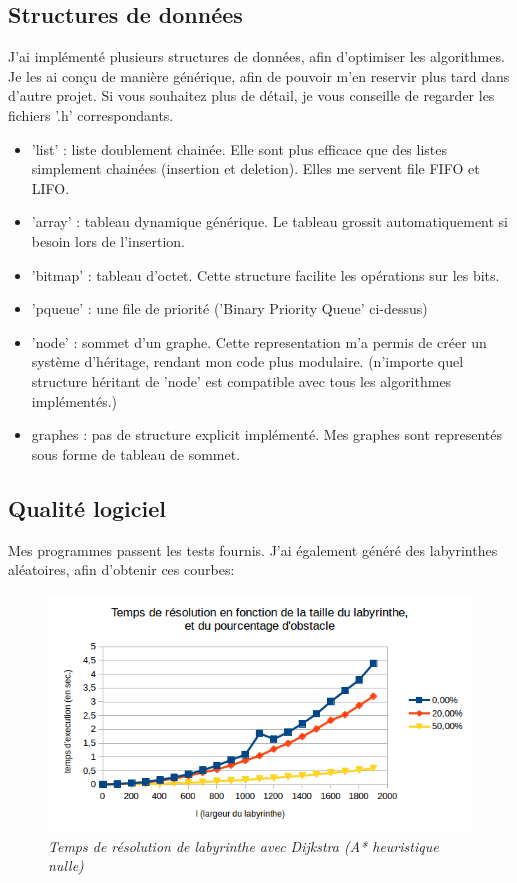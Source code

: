 \documentclass[a4paper,10pt]{article}
\begin{document}
    \subsection{Structures de données}
      J'ai implémenté plusieurs structures de données, afin d'optimiser les algorithmes. Je les ai conçu de manière générique,
      afin de pouvoir m'en reservir plus tard dans d'autre projet. Si vous souhaitez plus de détail, je vous
      conseille de regarder les fichiers '.h' correspondants.
      \begin{itemize}[label=-]
	\item 'list'   : liste doublement chainée. Elle sont plus efficace que des listes simplement chainées (insertion et deletion).
			Elles me servent file FIFO et LIFO.
	\item 'array'  : tableau dynamique générique. Le tableau grossit automatiquement si besoin lors de l'insertion.
	\item 'bitmap' : tableau d'octet. Cette structure facilite les opérations sur les bits.
	\item 'pqueue' : une file de priorité ('Binary Priority Queue' ci-dessus)
	\item 'node'   : sommet d'un graphe. Cette representation m'a permis de créer un système d'héritage,
			rendant mon code plus modulaire. (n'importe quel structure héritant de 'node'
			est compatible avec tous les algorithmes implémentés.)
	\item graphes  : pas de structure explicit implémenté. Mes graphes sont representés sous forme de tableau de sommet.
      \end{itemize}
      
      \subsection{Qualité logiciel}
	Mes programmes passent les tests fournis.\newline\newline
	J'ai également généré des labyrinthes aléatoires, afin d'obtenir ces courbes:
	\begin{figure}[!h]
	  \begin{center}
	    \includegraphics[width=12cm,height=\textheight,keepaspectratio]{./images/courbe_temps.png}
	  \end{center}
	  \caption{\textit{Temps de résolution de labyrinthe avec Dijkstra (A* heuristique nulle)}}
	\end{figure}
    
\end{document}
